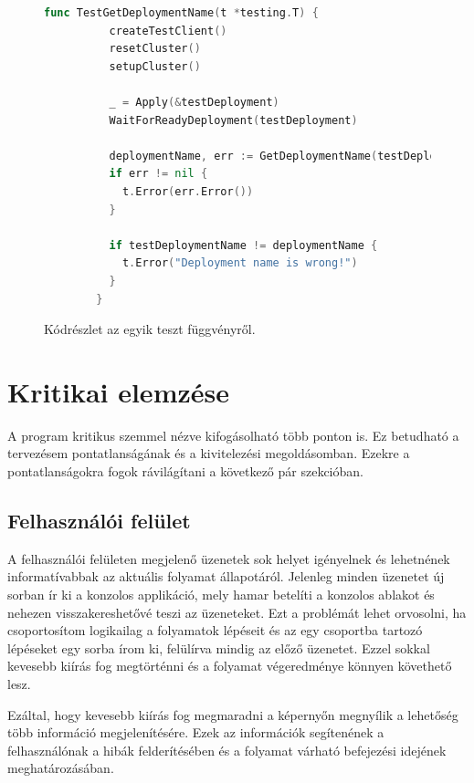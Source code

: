 \begin{figure}
  \centering
  \begin{minipage}{\linewidth}
      \begin{lstlisting}[language=go]
        func TestGetDeploymentName(t *testing.T) {
          createTestClient()
          resetCluster()
          setupCluster()
        
          _ = Apply(&testDeployment)
          WaitForReadyDeployment(testDeployment)
        
          deploymentName, err := GetDeploymentName(testDeploymentReleaseName, testNamespaceName)
          if err != nil {
            t.Error(err.Error())
          }
        
          if testDeploymentName != deploymentName {
            t.Error("Deployment name is wrong!")
          }
        }
      \end{lstlisting}
  \end{minipage}
  \caption{Kódrészlet az egyik teszt függvényről.}
    \label{test-code-snippet}
\end{figure}

\section{Kritikai elemzése}
A program kritikus szemmel nézve kifogásolható több ponton is.
Ez betudható a tervezésem pontatlanságának és a kivitelezési megoldásomban.
Ezekre a pontatlanságokra fogok rávilágítani a következő pár szekcióban.

\subsection*{Felhasználói felület}
A felhasználói felületen megjelenő üzenetek sok helyet igényelnek és lehetnének informatívabbak az aktuális folyamat állapotáról.
Jelenleg minden üzenetet új sorban ír ki a konzolos applikáció, mely hamar betelíti a konzolos ablakot és nehezen visszakereshetővé teszi az üzeneteket.
Ezt a problémát lehet orvosolni, ha csoportosítom logikailag a folyamatok lépéseit és az egy csoportba tartozó lépéseket egy sorba írom ki, felülírva mindig az előző üzenetet. Ezzel sokkal kevesebb kiírás fog megtörténni és a folyamat végeredménye könnyen követhető lesz.

Ezáltal, hogy kevesebb kiírás fog megmaradni a képernyőn megnyílik a lehetőség több információ megjelenítésére.
Ezek az információk segítenének a felhasználónak a hibák felderítésében és a folyamat várható befejezési idejének meghatározásában.


